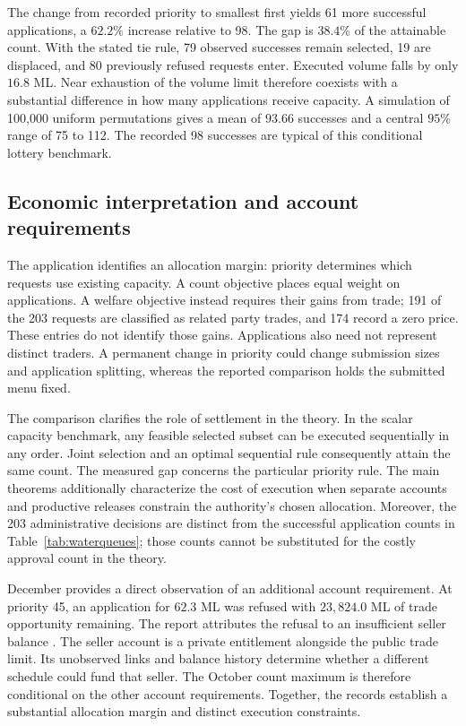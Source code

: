 \documentclass[ecta,draft]{econsocart}
\theoremstyle{definition}
\theoremstyle{definition}
\begin{document}
The change from recorded priority to smallest first yields 61 more successful
applications, a $62.2\%$ increase relative to 98. The gap is $38.4\%$ of
the attainable count. With the stated tie rule, 79 observed successes remain
selected, 19 are displaced, and 80 previously refused requests enter.
Executed volume falls by only $16.8$ ML. Near exhaustion of the volume limit
therefore coexists with a substantial difference in how many applications
receive capacity. A simulation of 100,000 uniform permutations gives a mean
of $93.66$ successes and a central $95\%$ range of 75 to 112. The recorded
98 successes are typical of this conditional lottery benchmark.

\subsection{Economic interpretation and account requirements}
The application identifies an allocation margin: priority determines which
requests use existing capacity. A count objective places equal weight on
applications. A welfare objective instead requires their gains from trade;
191 of the 203 requests are classified as related party trades, and 174
record a zero price. These entries do not identify those gains. Applications
also need not represent distinct traders. A permanent change in priority
could change submission sizes and application splitting, whereas the reported
comparison holds the submitted menu fixed.

The comparison clarifies the role of settlement in the theory. In the scalar
capacity benchmark, any feasible selected subset can be executed sequentially
in any order. Joint selection and an optimal sequential rule consequently
attain the same count. The measured gap concerns the particular priority
rule. The main theorems additionally characterize the cost of execution when
separate accounts and productive releases constrain the authority's chosen
allocation. Moreover, the 203 administrative decisions are distinct from
the successful application counts in Table~\ref{tab:waterqueues}; those
counts cannot be substituted for the costly approval count in the theory.

December provides a direct observation of an additional account requirement.
At priority 45, an application for $62.3$ ML was refused with $23{,}824.0$ ML
of trade opportunity remaining. The report attributes the refusal to an
insufficient seller balance \citep[Table~5, note~8]{DEECA2025December}.
The seller account is a private entitlement alongside the public trade
limit. Its unobserved links and balance history determine whether a different
schedule could fund that seller. The October count maximum is therefore
conditional on the other account requirements. Together, the records
establish a substantial allocation margin and distinct execution constraints.
\end{document}
